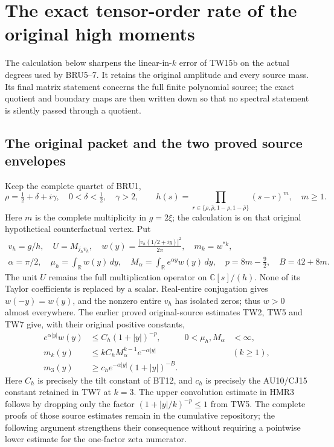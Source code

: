 \section{The exact tensor-order rate of the original high moments}
\label{sec:hmr-original-source}

The calculation below sharpens the linear-in-$k$ error of TW15b on
the actual degrees used by BRU5--7. It retains the original amplitude
and every source mass. Its final matrix statement concerns the full
finite polynomial source; the exact quotient and boundary maps are
then written down so that no spectral statement is silently passed
through a quotient.

\subsection{The original packet and the two proved source envelopes}

Keep the complete quartet of BRU1,
\[
 \rho=\tfrac12+\delta+i\gamma,\quad
 0<\delta<\tfrac12,\quad \gamma>2,\qquad
 h(s)=\prod_{r\in\{\rho,\bar\rho,1-\rho,1-\bar\rho\}}(s-r)^m,
 \quad m\geq1.
 \tag{HMR1}
\]
Here $m$ is the complete multiplicity in $g=2\xi$; the calculation
is on that original hypothetical counterfactual vertex. Put
\[
 \begin{gathered}
 v_h=g/h,\quad U=M_{j_hv_h},\quad
 w(y)=\frac{|v_h(1/2+iy)|^2}{2\pi},\quad
 m_k=w^{*k},\\
 \alpha=\pi/2,\quad
 \mu_h=\int_{\mathbb R}w(y)\,dy,\quad
 M_\alpha=\int_{\mathbb R}e^{\alpha y}w(y)\,dy,\quad
 p=8m-\tfrac92,\quad B=42+8m.
 \end{gathered}\tag{HMR2}
\]
The unit $U$ remains the full multiplication operator on
$\mathbb C[s]/(h)$. None of its Taylor coefficients is replaced by
a scalar. Real-entire conjugation gives $w(-y)=w(y)$, and the
nonzero entire $v_h$ has isolated zeros; thus $w>0$ almost
everywhere. The earlier proved original-source estimates TW2,
TW5 and TW7 give, with their original positive constants,
\[
 \begin{aligned}
 e^{\alpha|y|}w(y)&\leq C_h(1+|y|)^{-p},&
 0<\mu_h,M_\alpha&<\infty,\\
 m_k(y)&\leq kC_hM_\alpha^{k-1}e^{-\alpha|y|}
                  &&(k\geq1),\\
 m_3(y)&\geq c_he^{-\alpha|y|}(1+|y|)^{-B}.
 \end{aligned}\tag{HMR3}
\]
Here $C_h$ is precisely the tilt constant of BT12, and $c_h$
is precisely the AU10/CJ15 constant retained in TW7 at $k=3$.
The upper convolution estimate in HMR3 follows by dropping only
the factor $(1+|y|/k)^{-p}\leq1$ from TW5. The complete proofs
of those source estimates remain in the cumulative repository;
the following argument strengthens their consequence without
requiring a pointwise lower estimate for the one-factor zeta
numerator.

